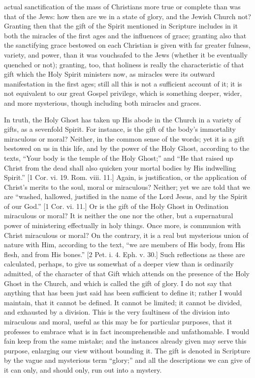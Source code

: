 actual sanctification of the mass of Christians more true or complete
than was that of the Jews: how then are we in a state of glory, and
the Jewish Church not? Granting then that the gift of the Spirit
mentioned in Scripture includes in it both the miracles of the first
ages and the influences of grace; granting also that the sanctifying
grace bestowed on each Christian is given with far greater fulness,
variety, and power, than it was vouchsafed to the Jews (whether it be
eventually quenched or not); granting, too, that holiness is really
the characteristic of that gift which the Holy Spirit ministers now,
as miracles were its outward manifestation in the first ages; still
all this is not a sufficient account of it; it is not equivalent to
our great Gospel privilege, which is something deeper, wider, and more
mysterious, though including both miracles and graces.

In truth, the Holy Ghost has taken up His abode in the Church in a
variety of gifts, as a sevenfold Spirit. For instance, is the gift of
the body's immortality miraculous or moral? Neither, in the common
sense of the words; yet it is a gift bestowed on us in this life, and
by the power of the Holy Ghost, according to the texts, ``Your
body is the temple of the Holy Ghost;'' and ``He that raised
up Christ from the dead shall also quicken your mortal bodies by His
indwelling Spirit.'' [1 Cor. vi. 19. Rom. viii. 11.] Again, is
justification, or the application of Christ's merits to the soul,
moral or miraculous? Neither; yet we are told that we are ``washed, hallowed, justified in the name of the Lord Jesus, and by the
Spirit of our God.'' [1 Cor. vi. 11.] Or is the gift of the Holy
Ghost in Ordination miraculous or moral? It is neither the one nor the
other, but a supernatural power of ministering effectually in holy
things. Once more, is communion with Christ miraculous or moral? On
the contrary, it is a real but mysterious union of nature with Him,
according to the text, ``we are members of His body, from His
flesh, and from His bones.'' [2 Pet. i. 4. Eph. v. 30.] Such
reflections as these are calculated, perhaps, to give us somewhat of a
deeper view than is ordinarily admitted, of the character of that Gift
which attends on the presence of the Holy Ghost in the Church, and
which is called the gift of glory. I do not say that anything that has
been just said has been sufficient to define it; rather I would
maintain, that it cannot be defined. It cannot be limited; it cannot
be divided, and exhausted by a division. This is the very faultiness
of the division into miraculous and moral, useful as this may be for
particular purposes, that it professes to embrace what is in fact
incomprehensible and unfathomable. I would fain keep from the same
mistake; and the instances already given may serve this purpose,
enlarging our view without bounding it. The gift is denoted in
Scripture by the vague and mysterious term ``glory;'' and all
the descriptions we can give of it can only, and should only, run out
into a mystery.

